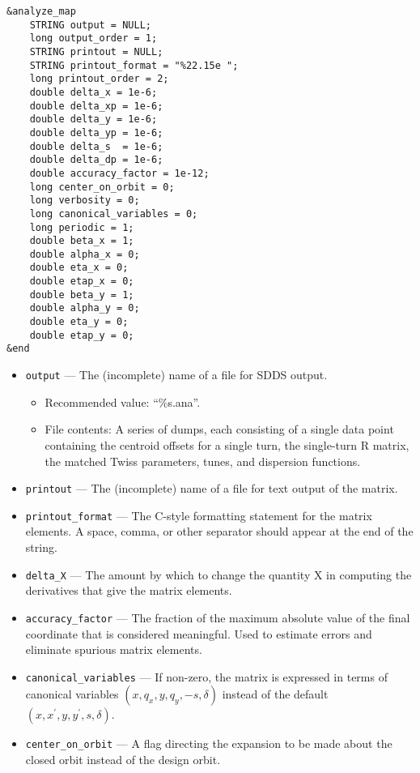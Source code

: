 \documentclass[11pt]{article}
\begin{document}
\begin{verbatim}
&analyze_map
    STRING output = NULL;
    long output_order = 1;
    STRING printout = NULL;
    STRING printout_format = "%22.15e ";
    long printout_order = 2;
    double delta_x = 1e-6;
    double delta_xp = 1e-6;
    double delta_y = 1e-6;
    double delta_yp = 1e-6;
    double delta_s  = 1e-6;
    double delta_dp = 1e-6;
    double accuracy_factor = 1e-12;
    long center_on_orbit = 0;
    long verbosity = 0;
    long canonical_variables = 0;
    long periodic = 1;
    double beta_x = 1;
    double alpha_x = 0;
    double eta_x = 0;
    double etap_x = 0;
    double beta_y = 1;
    double alpha_y = 0;
    double eta_y = 0;
    double etap_y = 0;
&end
\end{verbatim}

\begin{itemize}
\item \verb|output| --- The (incomplete) name of a file for SDDS output.
    \begin{itemize}
    \item Recommended value: ``\%s.ana''.
    \item File contents:  A series of dumps, each consisting of a single data point containing
        the centroid offsets for a single turn, the single-turn R matrix, the matched Twiss parameters, tunes, and 
        dispersion functions.
    \end{itemize}
\item \verb|printout| --- The (incomplete) name of a file for text output of the matrix.
\item \verb|printout_format| --- The C-style formatting statement for the matrix elements. A space, comma, or other separator
  should appear at the end of the string.
\item \verb|delta_X| --- The amount by which to change the quantity X in computing the derivatives that give the matrix elements.
\item \verb|accuracy_factor| --- The fraction of the maximum absolute value of the final coordinate that is considered meaningful.
  Used to estimate errors and eliminate spurious matrix elements.
\item \verb|canonical_variables| --- If non-zero, the matrix is expressed in terms of canonical variables $(x, q_x, y, q_y, -s, \delta)$
  instead of the default $(x, x^\prime, y, y^\prime, s, \delta)$.
\item \verb|center_on_orbit| --- A flag directing the expansion to be made about the closed orbit instead of the design orbit.

\end{itemize}
\end{document}
